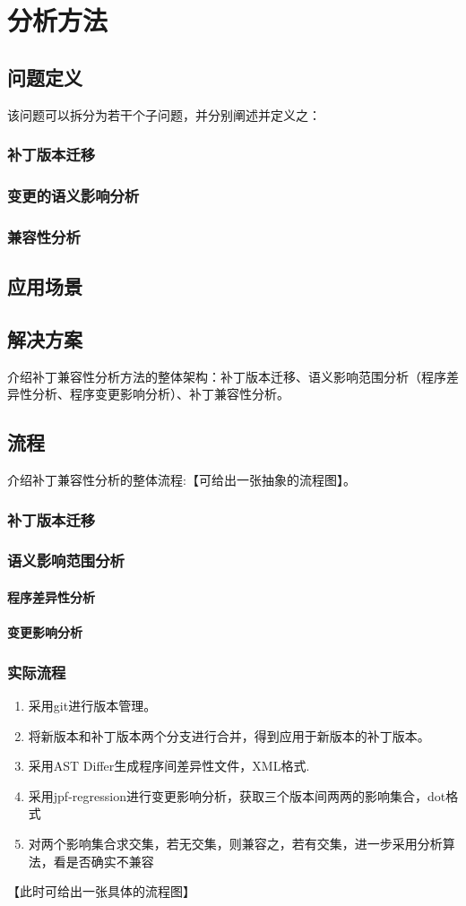 \chapter{分析方法}
\section{问题定义}
该问题可以拆分为若干个子问题，并分别阐述并定义之：

\subsection{补丁版本迁移}
\subsection{变更的语义影响分析}
\subsection{兼容性分析}

\section{应用场景}
\section{解决方案}
介绍补丁兼容性分析方法的整体架构：补丁版本迁移、语义影响范围分析（程序差异性分析、程序变更影响分析）、补丁兼容性分析。
\section{流程}
介绍补丁兼容性分析的整体流程:【可给出一张抽象的流程图】。
\subsection{补丁版本迁移}
\subsection{语义影响范围分析}
\subsubsection{程序差异性分析}
\subsubsection{变更影响分析}
\subsection{实际流程}

	\begin{enumerate}
		\item 采用git进行版本管理。
		\item 将新版本和补丁版本两个分支进行合并，得到应用于新版本的补丁版本。
		\item 采用AST Differ生成程序间差异性文件，XML格式.
		\item 采用jpf-regression进行变更影响分析，获取三个版本间两两的影响集合，dot格式
		\item 对两个影响集合求交集，若无交集，则兼容之，若有交集，进一步采用分析算法，看是否确实不兼容
	\end{enumerate}
	
	【此时可给出一张具体的流程图】
